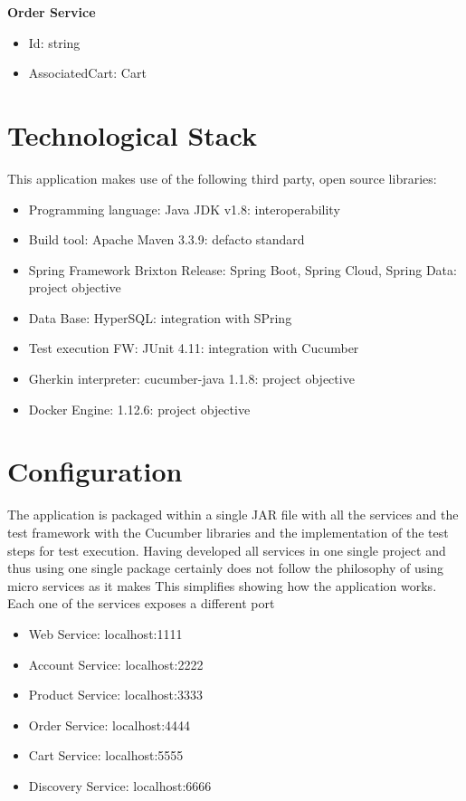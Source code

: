 \textbf{Order Service}
\begin{itemize}
\item Id: string
\item AssociatedCart: Cart\\
\end{itemize}


\section{Technological Stack}
This application makes use of the following third party, open source libraries:

\begin{itemize}
\item Programming language: Java JDK v1.8: interoperability
\item Build tool: Apache Maven 3.3.9: defacto standard
\item Spring Framework Brixton Release: Spring Boot, Spring Cloud, Spring Data: project objective
\item Data Base: HyperSQL: integration with SPring
\item Test execution FW: JUnit 4.11: integration with Cucumber
\item Gherkin interpreter: cucumber-java 1.1.8: project objective
\item Docker Engine: 1.12.6: project objective
\end{itemize}


\section{Configuration}
The application is packaged within a single JAR file with all the services and the test framework with the Cucumber libraries and the implementation of the test steps for test execution. Having developed all services in one single project and thus using one single package certainly does not follow the philosophy of using micro services as it makes This simplifies showing how the application works. Each one of the services exposes a different port

\begin{itemize}
\item Web Service: 				localhost:1111
\item Account Service: 		localhost:2222
\item Product Service: 		localhost:3333
\item Order Service: 			localhost:4444
\item Cart Service: 			localhost:5555
\item Discovery Service: 	localhost:6666
\end{itemize}

